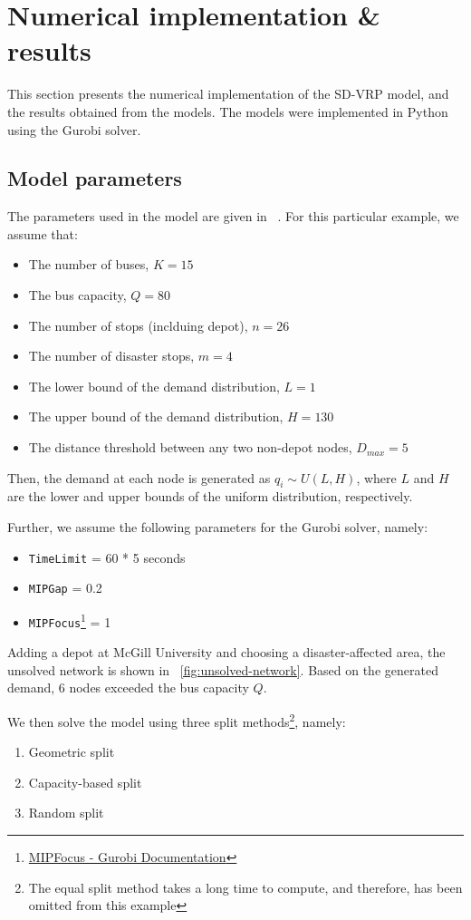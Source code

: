 \documentclass[12pt]{article}
\begin{document}
\newpage
\section{Numerical implementation \& results}
This section presents the numerical implementation of the SD-VRP model, and the results obtained from the models.
The models were implemented in Python using the Gurobi solver.

\subsection{Model parameters}
The parameters used in the model are given in ~. For this particular example, we assume that:
\begin{itemize}
    \item The number of buses, $K = 15$
    \item The bus capacity, $Q = 80$
    \item The number of stops (inclduing depot), $n = 26$
    \item The number of disaster stops, $m = 4$
    \item The lower bound of the demand distribution, $L = 1$
    \item The upper bound of the demand distribution, $H = 130$
    \item The distance threshold between any two non-depot nodes, $D_{max} = 5$
\end{itemize}

Then, the demand at each node is generated as $q_i \sim U(L, H)$, where $L$ and $H$ are the lower and upper bounds of the uniform distribution, respectively.

Further, we assume the following parameters for the Gurobi solver, namely:
\begin{itemize}
    \item \texttt{TimeLimit} = 60 * 5 seconds
    \item \texttt{MIPGap} = 0.2
    \item \texttt{MIPFocus}\footnote{\href{https://www.gurobi.com/documentation/current/refman/mipfocus.html}{MIPFocus - Gurobi Documentation}} = 1
\end{itemize}

Adding a depot at McGill University and choosing a disaster-affected area, the unsolved network is shown in ~\autoref{fig:unsolved-network}.
Based on the generated demand, 6 nodes exceeded the bus capacity $Q$.

We then solve the model using three split methods\footnote{The equal split method takes a long time to compute, and therefore, has been omitted from this example}, namely:
\begin{enumerate}
    \item Geometric split
    \item Capacity-based split
    \item Random split
\end{enumerate}
\end{document}
